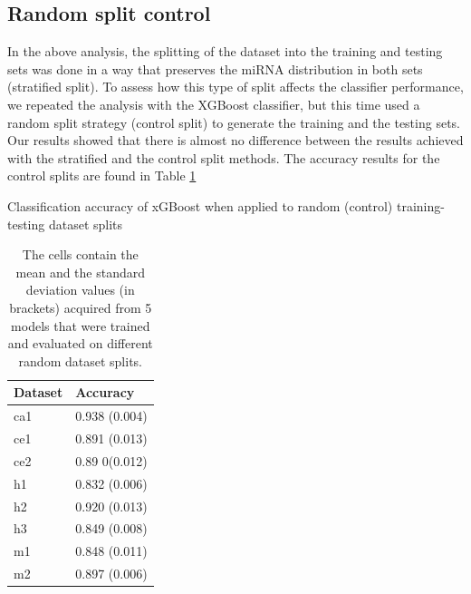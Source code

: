 


\subsection{Random split control}
In the above analysis, the splitting of the dataset into the training and testing sets was done in a way that preserves the miRNA distribution in both sets (stratified split). To assess how this type of split affects the classifier performance, we repeated the analysis with the XGBoost classifier, but this time used a random split strategy (control split) to generate the training and the testing sets. Our results showed that there is almost no difference between the results achieved with the stratified and the control split methods. The accuracy results for the control splits are found in Table \ref{tab:randomsplitacc}


\begin{table}[h!]
\caption{Classification accuracy of xGBoost when applied to random (control) training-testing dataset splits}
\label{tab:randomsplitacc}
\centering
\begin{tabular}{|l|l|}
\hline
\textbf{Dataset} & \textbf{Accuracy}      \\ \hline
ca1   & 0.938 (0.004) \\ \hline
ce1 & 0.891 (0.013) \\ \hline
ce2 & 0.89 0(0.012) \\ \hline
h1    & 0.832 (0.006) \\ \hline
h2    & 0.920 (0.013) \\ \hline
h3    & 0.849 (0.008) \\ \hline
m1    & 0.848 (0.011) \\ \hline
m2    & 0.897 (0.006) \\ \hline
\end{tabular}
\bigbreak
\caption*{The cells contain the mean and the standard deviation values (in brackets) acquired from 5 models that were trained and evaluated on different random dataset splits.}
\end{table}



